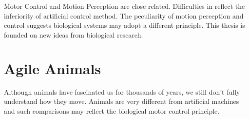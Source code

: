 Motor Control and Motion Perception are close related.
Difficulties in \cms reflect the inferiority of artificial control method.
The peculiarity of motion perception and control suggests  biological systems may adopt a different principle.
This thesis is founded on new ideas from biological research.

 

\section{Agile Animals}
Although animals have fascinated us for thousands of years, we still don't fully understand how they move.
Animals are very different from artificial machines and such comparisons may reflect the  biological motor control principle.

